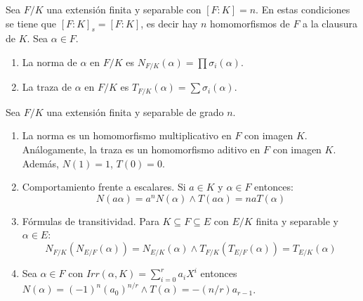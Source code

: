 \begin{definition}
Sea $F/K$ una extensión finita y separable con $[F:K] = n$. En estas condiciones se tiene 
que $[F:K]_s = [F:K]$, es decir hay $n$ homomorfismos de $F$ a la clausura de $K$. Sea $\alpha \in F$.

\begin{enumerate}
\item La norma de $\alpha$ en $F/K$ es $N_{F/K}(\alpha) = \prod \sigma_i(\alpha)$. 
\item La traza de $\alpha$ en $F/K$ es $T_{F/K}(\alpha) = \sum \sigma_i(\alpha)$. 
\end{enumerate}
\end{definition}

\begin{proposition}
Sea $F/K$ una extensión finita y separable de grado $n$. 

\begin{enumerate}
\item La norma es un homomorfismo multiplicativo en $F$ con imagen $K$. \\
Análogamente, la traza es un 
homomorfismo aditivo en $F$ con imagen $K$. \\
Además, $N(1) = 1$, $T(0) = 0$. 
\item Comportamiento frente a escalares. Si $a \in K$ y $\alpha \in F$ entonces: $$N(a \alpha) = a^n N(\alpha) \land T(a\alpha) = na T(\alpha)$$
\item Fórmulas de transitividad. Para $K \subseteq F \subseteq E$ con $E/K$ finita y separable y $\alpha \in E$: $$N_{F/K}(N_{E/F}(\alpha)) = N_{E/K}(\alpha) \land T_{F/K}(T_{E/F}(\alpha)) = T_{E/K}(\alpha)$$ 

\item Sea $\alpha \in F$ con $Irr(\alpha,K) = \sum_{i = 0}^r a_iX^i$ entonces $N(\alpha) = (-1)^n(a_0)^{n/r} \land T(\alpha) = -(n/r)a_{r-1}$.
\end{enumerate}
\end{proposition}





